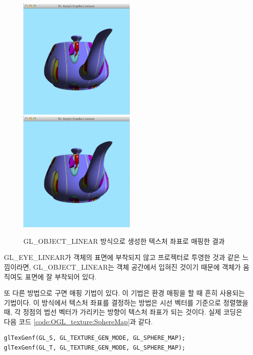 \begin{figure}[h!]
  \centering
	\includegraphics[height=6cm]{OGL_texture/objLinear1.png}
	\includegraphics[height=6cm]{OGL_texture/objLinear2.png}
    \caption{{\sf GL\_OBJECT\_LINEAR} 방식으로 생성한 텍스처 좌표로 매핑한 결과}
    \label{fig:OGL_texture:objLinear}
\end{figure}

{\sf GL\_EYE\_LINEAR}가 객체의 표면에 부착되지 않고 프로젝터로 투영한 것과 같은 느낌이라면, 
{\sf GL\_OBJECT\_LINEAR}는 객체 공간에서 입혀진 것이기 때문에 객체가 움직여도 표면에 잘 부착되어 있다. 

또 다른 방법으로 구면 매핑 기법이 있다. 이 기법은 환경 매핑을 할 때 흔히 사용되는 기법이다. 이 방식에서 텍스처 좌표를 결정하는 방법은 시선 벡터를 기준으로 정렬했을 때, 각 정점의 법선 벡터가 가리키는 방향이 텍스처 좌표가 되는 것이다.  실제 코딩은 다음 코드 \ref{code:OGL_texture:SphereMap}과 같다.

\begin{algorithmbis}\label{code:OGL_texture:SphereMap}
\lstset{language=C++} 
\begin{lstlisting}
glTexGenf(GL_S, GL_TEXTURE_GEN_MODE, GL_SPHERE_MAP);
glTexGenf(GL_T, GL_TEXTURE_GEN_MODE, GL_SPHERE_MAP);
\end{lstlisting}
\end{algorithmbis}

